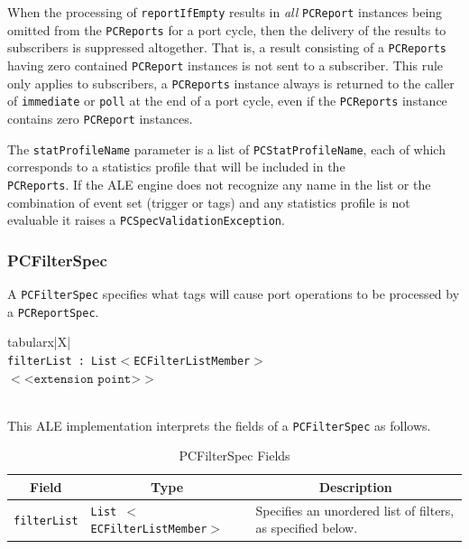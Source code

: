 \documentclass[11pt,a4paper,oneside]{article}
\newenvironment{bbox}%
{\begin{table}[h!]\begin{threeparttable}}%
{\end{threeparttable}\end{table}\FloatBarrier}
\newenvironment{bbox}
{\ifvmode\IgnorePar\fi \EndP\Tg<div class='bbox'>}{\Tg</div>\IgnoreIndent}
\begin{document}
When the processing of \texttt{reportIfEmpty} results in \emph{all} \texttt{PCReport} instances being omitted from the \texttt{PCReports} for a port cycle, then the delivery of the results to subscribers is suppressed altogether. That is, a result consisting of a \texttt{PCReports} having zero contained \texttt{PCReport} instances is not sent to a subscriber. This rule only applies to subscribers, a \texttt{PCReports} instance always is returned to the caller of \texttt{immediate} or \texttt{poll} at the end of a port cycle, even if the \texttt{PCReports} instance contains zero \texttt{PCReport} instances.

The \texttt{statProfileName} parameter is a list of \texttt{PCStatProfileName}, each of which corresponds to a statistics profile that will be included in the\ifpdf\\\fi
\texttt{PCReports}. If the ALE engine does not recognize any name in the list or the combination of event set (trigger or tags) and any statistics profile is not evaluable it raises a \texttt{PCSpecValidationException}.

\subsubsection{PCFilterSpec}
\label{subsec: PCFilter}
A \texttt{PCFilterSpec} specifies what tags will cause port operations to be processed by a \texttt{PCReportSpec}.

\begin{bbox}
\begin{edtable}{tabularx}{\linewidth}{|X|}
\hline 
{}
\\
\texttt{filterList : List$<$ECFilterListMember$>$}\\
$<$<$\texttt{extension point}$>$>$\\
\texttt{\textendash \textendash \textendash}\\
\hline
\end{edtable}
\end{bbox}

This ALE implementation interprets the fields of a \texttt{PCFilterSpec} as follows.

\begin{table}[!h]
\begin{tabularx}{\linewidth}{|l|l|X|}
\hline
\multicolumn{1}{|c|}{\textbf{Field}}&
\multicolumn{1}{c|}{\textbf{Type}}&
\multicolumn{1}{c|}{\textbf{Description}}\\
\hline 
\texttt{filterList} &\texttt{List $<$ECFilterListMember$>$}&Specifies an unordered list of filters, as specified below. \\ 
\hline 
\end{tabularx}
\caption{PCFilterSpec Fields}
\MakeLineNo
\end{table}
\end{document}
